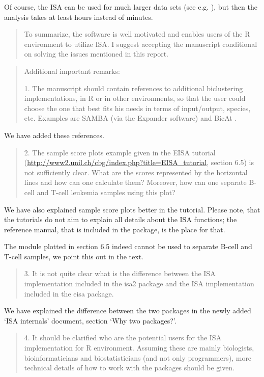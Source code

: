 \documentclass[a4paper]{article}
\begin{document}
Of course, the ISA can be used for much larger data sets (see
e.g. \cite{bergmann04}), but then the analysis takes at least hours
instead of minutes.

\begin{quote}
To summarize, the software is well motivated and enables users of the
R environment to utilize ISA. I suggest accepting the manuscript
conditional on solving the issues mentioned in this report. 
\end{quote}

\begin{quote}
Additional important remarks:

1.      The manuscript should contain references to additional
biclustering implementations, in R or in other environments, so that
the user could choose the one that best fits his needs in terms of
input/output, species, etc. Examples are SAMBA (via the Expander
software) \citep{sharan02,tanay04} and BicAt \citep{barkow06}. 
\end{quote}

We have added these references.

\begin{quote}
2.      The sample score plots example given in the EISA tutorial
(\url{http://www2.unil.ch/cbg/index.php?title=EISA\_tutorial}, section 6.5)
is not sufficiently clear. What are the scores represented by the
horizontal lines and how can one calculate them? Moreover, how can one
separate B-cell and T-cell leukemia samples using this plot? 
\end{quote}

We have also explained sample score plots better in the tutorial. 
Please note, that the tutorials do not aim to explain all details 
about the ISA functions; the reference manual, that is included in the
package, is the place for that.

The module plotted in section 6.5 indeed cannot be used to separate
B-cell and T-cell samples, we point this out in the text.

\begin{quote}
3.      It is not quite clear what is the difference between the ISA
implementation included in the isa2 package and the ISA implementation
included in the eisa package. 
\end{quote}

We have explained the difference between the two packages in the newly
added `ISA internals' document, section `Why two packages?'.

\begin{quote}
4.      It should be clarified who are the potential users for the ISA
implementation for R environment. Assuming these are mainly
biologists, bioinformaticians and biostatisticians (and not only
programmers), more technical details of how to work with the packages
should be given.
\end{quote}
\end{document}
